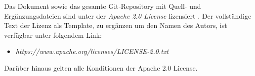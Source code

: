{	Das Dokument sowie das gesamte Git-Repository mit Quell- und Erg\"anzungsdateien sind unter der \textit{Apache 2.0 License} lizensiert \cite{Apa04}.
	Der vollst\"andige Text der Lizenz als Template, zu erg\"anzen um den Namen des Autors, ist verf\"ugbar unter folgendem Link:
	\begin{itemize}
		\item[] \textit{https://www.apache.org/licenses/LICENSE-2.0.txt}
	\end{itemize}
	
	Dar\"uber hinaus gelten alle Konditionen der Apache 2.0 License.
	
}